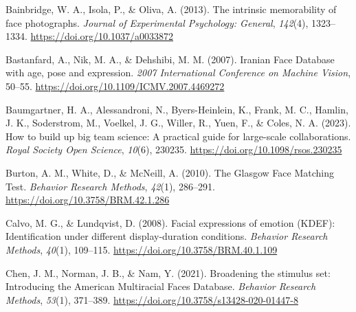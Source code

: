 \documentclass[
  letterpaper,
  DIV=11,
  numbers=noendperiod]{scrartcl}
\newlength{\cslhangindent}
\newenvironment{CSLReferences}[2] %
 {\begin{list}{}{%
  \setlength{\itemindent}{0pt}
  \setlength{\leftmargin}{0pt}
  \setlength{\parsep}{0pt}
  \ifodd #1
   \setlength{\leftmargin}{\cslhangindent}
   \setlength{\itemindent}{-1\cslhangindent}
  \fi
  \setlength{\itemsep}{#2\baselineskip}}}
 {\end{list}}
\newlength\Oldarrayrulewidth
\newlength\Oldtabcolsep
\begin{document}

\protect{}\label{refs}
\begin{CSLReferences}{1}{0}
Bainbridge, W. A., Isola, P., \& Oliva, A. (2013). The intrinsic
memorability of face photographs. \emph{Journal of Experimental
Psychology: General}, \emph{142}(4), 1323--1334.
\url{https://doi.org/10.1037/a0033872}

Bastanfard, A., Nik, M. A., \& Dehshibi, M. M. (2007). Iranian {Face}
{Database} with age, pose and expression. \emph{2007 {International}
{Conference} on {Machine} {Vision}}, 50--55.
\url{https://doi.org/10.1109/ICMV.2007.4469272}

Baumgartner, H. A., Alessandroni, N., Byers-Heinlein, K., Frank, M. C.,
Hamlin, J. K., Soderstrom, M., Voelkel, J. G., Willer, R., Yuen, F., \&
Coles, N. A. (2023). How to build up big team science: A practical guide
for large-scale collaborations. \emph{Royal Society Open Science},
\emph{10}(6), 230235. \url{https://doi.org/10.1098/rsos.230235}

Burton, A. M., White, D., \& McNeill, A. (2010). The {Glasgow} {Face}
{Matching} {Test}. \emph{Behavior Research Methods}, \emph{42}(1),
286--291. \url{https://doi.org/10.3758/BRM.42.1.286}

Calvo, M. G., \& Lundqvist, D. (2008). Facial expressions of emotion
({KDEF}): {Identification} under different display-duration conditions.
\emph{Behavior Research Methods}, \emph{40}(1), 109--115.
\url{https://doi.org/10.3758/BRM.40.1.109}

Chen, J. M., Norman, J. B., \& Nam, Y. (2021). Broadening the stimulus
set: {Introducing} the {American} {Multiracial} {Faces} {Database}.
\emph{Behavior Research Methods}, \emph{53}(1), 371--389.
\url{https://doi.org/10.3758/s13428-020-01447-8}


\end{CSLReferences}
\end{document}
